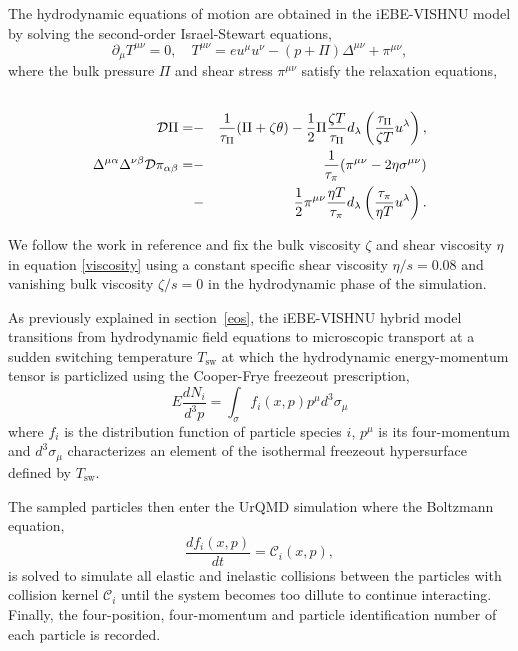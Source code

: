 \documentclass[aps,prc,reprint,amsmath,nofootinbib,superscriptaddress]{revtex4-1}
\begin{document}
The hydrodynamic equations of motion are obtained in the iEBE-VISHNU model by solving the second-order Israel-Stewart equations,
\begin{equation}
 \partial_\mu T^{\mu\nu} = 0, \quad T^{\mu\nu} = e u^\mu u^\nu - (p + \Pi) \Delta^{\mu\nu} + \pi^{\mu\nu},
\end{equation}
where the bulk pressure $\Pi$ and shear stress $\pi^{\mu\nu}$ satisfy the relaxation equations,
\begin{eqnarray}
 \label{viscosity}
 \cr \mathcal{D}\Pi = &-&\frac{1}{\tau_\Pi}(\Pi + \zeta \theta) - \frac{1}{2} \Pi \frac{\zeta T}{\tau_\Pi}d_\lambda \left(\frac{\tau_\Pi}{\zeta T} u^\lambda \right), \nonumber \\
  \Delta^{\mu\alpha} \Delta^{\nu\beta} \mathcal{D}\pi_{\alpha\beta} = &-&\frac{1}{\tau_\pi}(\pi^{\mu\nu} - 2 \eta \sigma^{\mu\nu}) \\
  &-& \frac{1}{2} \pi^{\mu\nu} \frac{\eta T}{\tau_\pi} d_\lambda\left(\frac{\tau_\pi}{\eta T} u^\lambda \right ).
\end{eqnarray}

We follow the work in reference \cite{Shen:2014sfi} and fix the bulk viscosity $\zeta$ and shear viscosity $\eta$ in equation \eqref{viscosity} using a constant specific shear viscosity $\eta/s=0.08$ 
and vanishing bulk viscosity $\zeta/s=0$ in the hydrodynamic phase of the simulation. 

As previously explained in section \,\ref{eos}, the iEBE-VISHNU hybrid model transitions from hydrodynamic field equations to microscopic transport at a sudden switching temperature $T_\text{sw}$ 
at which the hydrodynamic energy-momentum tensor is particlized using the Cooper-Frye freezeout prescription,
\begin{equation}
 E\frac{dN_i}{d^3p} = \int_\sigma f_i(x,p) p^\mu d^3\sigma_\mu
 \label{cooper-frye}
\end{equation}
where $f_i$ is the distribution function of particle species $i$, $p^\mu$ is its four-momentum and $d^3\sigma_\mu$ characterizes an element of the isothermal freezeout 
hypersurface defined by $T_\text{sw}$.

The sampled particles then enter the UrQMD simulation where the Boltzmann equation, 
\begin{equation}
 \frac{df_i(x,p)}{dt} = \mathcal{C}_i(x,p),
\end{equation}
is solved to simulate all elastic and inelastic collisions between the particles with collision kernel $\mathcal{C}_i$ until the system becomes too dillute to continue interacting. 
Finally, the four-position, four-momentum and particle identification number of each particle is recorded. 
\end{document}
